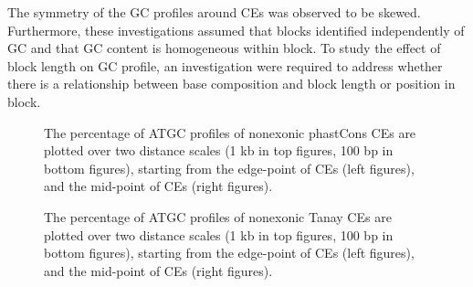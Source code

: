 \documentclass[12pt]{report}
\begin{document}
The symmetry of the GC profiles around CEs was observed to be skewed. Furthermore, these investigations assumed that blocks identified independently of GC and that GC content is homogeneous within block. To study the effect of block length on GC profile, an investigation were required to address whether there is a relationship between base composition and block length or position in block.\\

\begin{figure}[htbp]
\centering
{}
\caption{The percentage of ATGC profiles of nonexonic phastCons CEs are plotted over two distance scales (1 kb in top figures, 100 bp in bottom figures), starting from the edge-point of CEs (left figures), and the mid-point of CEs (right figures).}
\label{fig:ATGC_phast}
\end{figure}

\begin{figure}[htbp]
\centering
{}
\caption{The percentage of ATGC profiles of nonexonic Tanay CEs are plotted over two distance scales (1 kb in top figures, 100 bp in bottom figures), starting from the edge-point of CEs (left figures), and the mid-point of CEs (right figures).}
\label{fig:ATGC_tan}
\end{figure}
\end{document}
